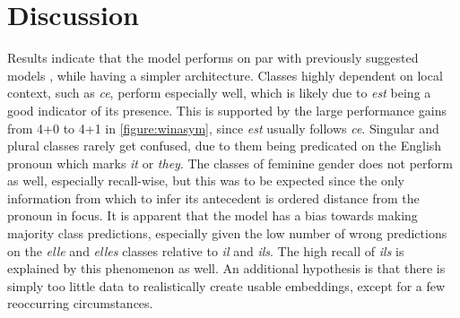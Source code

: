 \documentclass[11pt]{article}
\begin{document}
\begin{table}[t]
    \caption{Confusion matrix of class predictions. Row signifies actual class according to gold standard, while column represents predicted class according to the classifier.}
    \label{tbl:confmatrix}
\end{table}

\section{Discussion}

Results indicate that the model performs on par with previously suggested models \cite{Hardmeier2013Latent}, while having a simpler architecture.
Classes highly dependent on local context, such as \emph{ce}, perform especially well, which is likely due to \emph{est} being a good indicator of its presence.
This is supported by the large performance gains from 4+0 to 4+1 in \cref{figure:winasym}, since \emph{est} usually follows \emph{ce}.
Singular and plural classes rarely get confused, due to them being predicated on the English pronoun which marks \emph{it} or \emph{they}.
The classes of feminine gender does not perform as well, especially recall-wise, but this was to be expected since the only information from which to infer its antecedent is ordered distance from the pronoun in focus.
It is apparent that the model has a bias towards making majority class predictions, especially given the low number of wrong predictions on the \emph{elle} and \emph{elles} classes relative to \emph{il} and \emph{ils}.
The high recall of \emph{ils} is explained by this phenomenon as well.
An additional hypothesis is that there is simply too little data to realistically create usable embeddings, except for a few reoccurring circumstances.
\end{document}
